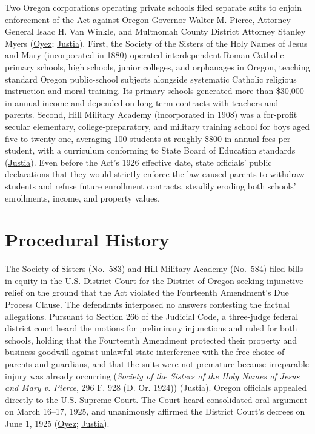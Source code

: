 \documentclass[12pt]{article}
\begin{document}
Two Oregon corporations operating private schools filed separate suits to enjoin enforcement of the Act against Oregon Governor Walter M. Pierce, Attorney General Isaac H. Van Winkle, and Multnomah County District Attorney Stanley Myers (\href{https://www.oyez.org/cases/1900-1940/268us510}{Oyez}; \href{https://supreme.justia.com/cases/federal/us/268/510/}{Justia}). First, the Society of the Sisters of the Holy Names of Jesus and Mary (incorporated in 1880) operated interdependent Roman Catholic primary schools, high schools, junior colleges, and orphanages in Oregon, teaching standard Oregon public-school subjects alongside systematic Catholic religious instruction and moral training. Its primary schools generated more than \$30,000 in annual income and depended on long-term contracts with teachers and parents. Second, Hill Military Academy (incorporated in 1908) was a for-profit secular elementary, college-preparatory, and military training school for boys aged five to twenty-one, averaging 100 students at roughly \$800 in annual fees per student, with a curriculum conforming to State Board of Education standards (\href{https://supreme.justia.com/cases/federal/us/268/510/}{Justia}). Even before the Act's 1926 effective date, state officials' public declarations that they would strictly enforce the law caused parents to withdraw students and refuse future enrollment contracts, steadily eroding both schools' enrollments, income, and property values.

\section{Procedural History}
The Society of Sisters (No.~583) and Hill Military Academy (No.~584) filed bills in equity in the U.S. District Court for the District of Oregon seeking injunctive relief on the ground that the Act violated the Fourteenth Amendment's Due Process Clause. The defendants interposed no answers contesting the factual allegations. Pursuant to Section 266 of the Judicial Code, a three-judge federal district court heard the motions for preliminary injunctions and ruled for both schools, holding that the Fourteenth Amendment protected their property and business goodwill against unlawful state interference with the free choice of parents and guardians, and that the suits were not premature because irreparable injury was already occurring (\textit{Society of the Sisters of the Holy Names of Jesus and Mary v. Pierce}, 296 F. 928 (D. Or. 1924)) (\href{https://supreme.justia.com/cases/federal/us/268/510/}{Justia}). Oregon officials appealed directly to the U.S. Supreme Court. The Court heard consolidated oral argument on March 16--17, 1925, and unanimously affirmed the District Court's decrees on June 1, 1925 (\href{https://www.oyez.org/cases/1900-1940/268us510}{Oyez}; \href{https://supreme.justia.com/cases/federal/us/268/510/}{Justia}).
\end{document}
